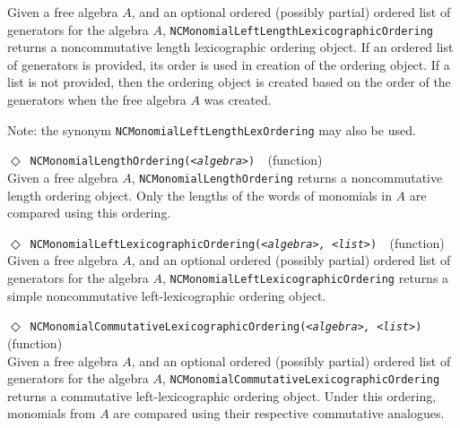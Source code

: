 \documentclass[a4paper,11pt]{report}
\begin{document}
{{{ Given a free algebra $A$, and an optional ordered (possibly partial) ordered list of generators for
the algebra $A$, \texttt{NCMonomialLeftLengthLexicographicOrdering} returns a noncommutative length lexicographic ordering object. If an ordered
list of generators is provided, its order is used in creation of the ordering
object. If a list is not provided, then the ordering object is created based
on the order of the generators when the free algebra $A$ was created. 

 Note: the synonym \texttt{NCMonomialLeftLengthLexOrdering} may also be used. 

 \noindent\textcolor{FuncColor}{$\Diamond$\ \texttt{NCMonomialLengthOrdering({\slshape {\textless}algebra{\textgreater}})
\label{NCMonomialLengthOrdering}
}\hfill{\scriptsize (function)}}\\


 Given a free algebra $A$, \texttt{NCMonomialLengthOrdering} returns a noncommutative length ordering object. Only the lengths of the words
of monomials in $A$ are compared using this ordering. 

 \noindent\textcolor{FuncColor}{$\Diamond$\ \texttt{NCMonomialLeftLexicographicOrdering({\slshape {\textless}algebra{\textgreater}, {\textless}list{\textgreater}})
\label{NCMonomialLeftLexicographicOrdering}
}\hfill{\scriptsize (function)}}\\


 Given a free algebra $A$, and an optional ordered (possibly partial) ordered list of generators for
the algebra $A$, \texttt{NCMonomialLeftLexicographicOrdering} returns a simple noncommutative left-lexicographic ordering object. 

 \noindent\textcolor{FuncColor}{$\Diamond$\ \texttt{NCMonomialCommutativeLexicographicOrdering({\slshape {\textless}algebra{\textgreater}, {\textless}list{\textgreater}})
\label{NCMonomialCommutativeLexicographicOrdering}
}\hfill{\scriptsize (function)}}\\


 Given a free algebra $A$, and an optional ordered (possibly partial) ordered list of generators for
the algebra $A$, \texttt{NCMonomialCommutativeLexicographicOrdering} returns a commutative left-lexicographic ordering object. Under this ordering,
monomials from $A$ are compared using their respective commutative analogues. 

}}}
\end{document}
